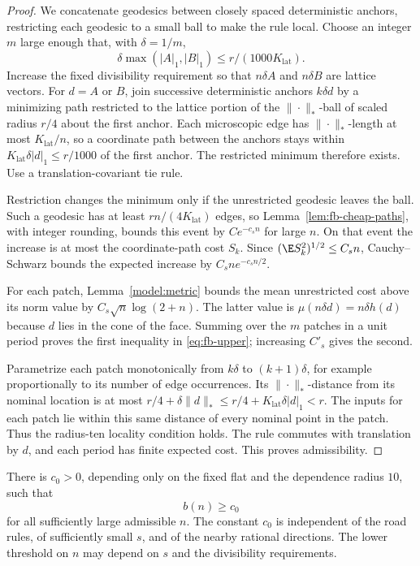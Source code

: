 \begin{proof}
We concatenate geodesics between closely spaced deterministic anchors,
restricting each geodesic to a small ball to make the rule local.
Choose an integer $m$ large enough that, with $\delta=1/m$,
\[
 \delta\max(|A|_1,|B|_1)\le r/(1000K_{\mathrm{lat}}).
\]
Increase the fixed divisibility requirement so that $n\delta A$ and
$n\delta B$ are lattice vectors.  For $d=A$ or $B$, join successive
deterministic anchors $k\delta d$ by a minimizing path restricted to
the lattice portion of the $\|\cdot\|_*$-ball of scaled radius $r/4$
about the first anchor.  Each microscopic edge has $\|\cdot\|_*$-length
at most $K_{\mathrm{lat}}/n$, so a coordinate path between the anchors stays within
$K_{\mathrm{lat}}\delta|d|_1\le r/1000$ of the first anchor.  The restricted minimum
therefore exists.  Use a translation-covariant tie rule.

Restriction changes the minimum only if the unrestricted geodesic
leaves the ball.  Such a geodesic has at least
$rn/(4K_{\mathrm{lat}})$ edges, so Lemma~\ref{lem:fb-cheap-paths},
with integer rounding, bounds this event by $Ce^{-c_s n}$ for large
$n$.  On that event the increase is at most the coordinate-path cost
$S_k$.  Since $(\E S_k^2)^{1/2}\le C_s n$, Cauchy--Schwarz
bounds the expected increase by $C_s n e^{-c_s n/2}$.

For each patch, Lemma~\ref{model:metric} bounds the mean unrestricted
cost above its norm value by $C_s\sqrt n\log(2+n)$.  The latter value
is $\mu(n\delta d)=n\delta h(d)$ because $d$ lies in the cone of the
face.  Summing over the $m$ patches in a unit period proves the first
inequality in \eqref{eq:fb-upper}; increasing $C'_s$ gives the second.

Parametrize each patch monotonically from $k\delta$ to
$(k+1)\delta$, for example proportionally to its number of edge
occurrences.  Its $\|\cdot\|_*$-distance from its nominal location is
at most $r/4+\delta\|d\|_*\le r/4+K_{\mathrm{lat}}\delta|d|_1<r$.
The inputs for each patch lie within this same distance of every
nominal point in the patch.  Thus the radius-ten locality condition
holds.  The rule commutes with translation by $d$, and each period
has finite expected cost.  This proves admissibility.
\end{proof}

\begin{proposition}
\label{prop:fb-positive}
There is $c_0>0$, depending only on the fixed flat and the dependence
radius $10$, such that
\begin{equation}
 b(n)\ge c_0
 \label{eq:fb-positive}
\end{equation}
for all sufficiently large admissible $n$.  The constant $c_0$ is
independent of the road rules, of sufficiently small $s$, and of the
nearby rational directions.  The lower threshold on $n$ may depend
on $s$ and the divisibility requirements.
\end{proposition}

